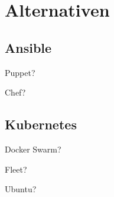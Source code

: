 \chapter{Alternativen}
\section{Ansible}
Puppet?

Chef?
\section{Kubernetes}
Docker Swarm?

Fleet?

Ubuntu?